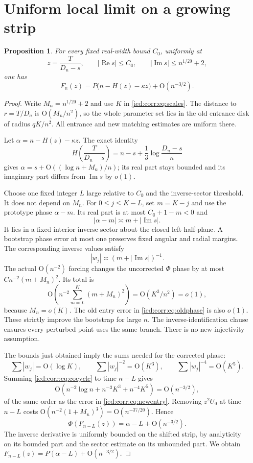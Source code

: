 \documentclass[11pt,letterpaper]{article}
\newtheorem{proposition}[theorem]{Proposition}
\theoremstyle{remark}\newtheorem{remark}[theorem]{Remark}
\newcommand{\Oh}{\mathrm O}\newcommand{\supp}{\operatorname{supp}}
\newcommand{\Rea}{\operatorname{Re}}\newcommand{\Ima}{\operatorname{Im}}
\begin{document}
\section{Uniform local limit on a growing strip}\label{ied:corr:sec:strip}
\begin{proposition}\label{ied:corr:prop:correctedlocal}
For every fixed real-width bound $C_0$, uniformly at
\[
 z=\frac T{D_n-s},\qquad |\Rea s|\le C_0,\qquad
 |\Ima s|\le n^{1/20}+2,
\]
one has
\begin{equation}\label{ied:corr:eq:localcorrected}
 F_n(z)=P\bigl(n-H(z)-\kappa z\bigr)+\Oh(n^{-3/2}).
\end{equation}
\end{proposition}
\begin{proof}
Write $M_n=n^{1/20}+2$ and use $K$ in \eqref{ied:corr:eq:scales}. The distance to $r=T/D_n$ is $\Oh(M_n/n^2)$, so the whole parameter set lies in the old entrance disk of radius $qK/n^2$. All entrance and new matching estimates are uniform there.

Let $\alpha=n-H(z)-\kappa z$. The exact identity
\[
 H\left(\frac T{D_n-s}\right)=n-s+\frac13\log\frac{D_n-s}{n}
\]
gives $\alpha=s+\Oh((\log n+M_n)/n)$; its real part stays bounded and its imaginary part differs from $\Ima s$ by $o(1)$.

Choose one fixed integer $L$ large relative to $C_0$ and the inverse-sector threshold. It does not depend on $M_n$. For $0\le j\le K-L$, set $m=K-j$ and use the prototype phase $\alpha-m$. Its real part is at most $C_0+1-m<0$ and
\[
 |\alpha-m|\asymp m+|\Ima s|.
\]
It lies in a fixed interior inverse sector about the closed left half-plane. A bootstrap phase error at most one preserves fixed angular and radial margins. The corresponding inverse values satisfy
\begin{equation}\label{ied:corr:eq:latevalues}
 |w_j|\asymp(m+|\Ima s|)^{-1}.
\end{equation}
The actual $\Oh(n^{-2})$ forcing changes the uncorrected $\Phi$ phase by at most $Cn^{-2}(m+M_n)^2$. Its total is
\[
 \Oh\left(n^{-2}\sum_{m=L}^K(m+M_n)^2\right)
       =\Oh(K^3/n^2)=o(1),
\]
because $M_n=o(K)$. The old entry error in \eqref{ied:corr:eq:oldphase} is also $o(1)$. These strictly improve the bootstrap for large $n$. The inverse-identification clause ensures every perturbed point uses the same branch. There is no new injectivity assumption.

The bounds just obtained imply the sums needed for the corrected phase:
\[
 \sum|w_j|=\Oh(\log K),\qquad
 \sum|w_j|^{-2}=\Oh(K^3),\qquad
 \sum|w_j|^{-4}=\Oh(K^5).
\]
Summing \eqref{ied:corr:eq:cocycle} to time $n-L$ gives
\[
 \Oh(n^{-2}\log n+n^{-3}K^3+n^{-4}K^5)=\Oh(n^{-3/2}),
\]
of the same order as the error in \eqref{ied:corr:eq:newentry}. Removing $z^2U_0$ at time $n-L$ costs
$\Oh(n^{-2}(1+M_n)^3)=\Oh(n^{-37/20})$. Hence
\[
 \Phi(F_{n-L}(z))=\alpha-L+\Oh(n^{-3/2}).
\]
The inverse derivative is uniformly bounded on the shifted strip, by analyticity on its bounded part and the sector estimate on its unbounded part. We obtain
$F_{n-L}(z)=P(\alpha-L)+\Oh(n^{-3/2})$.


\end{proof}
\end{document}
